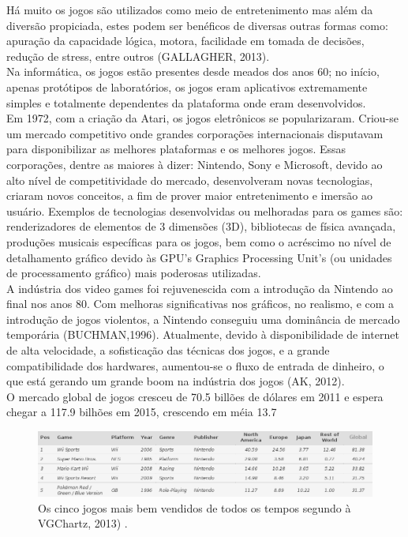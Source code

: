 \documentclass{article}
\begin{document}
Há muito os jogos são utilizados como meio de entretenimento mas além da diversão propiciada, estes podem ser benéficos de diversas outras formas como: apuração da capacidade lógica, motora, facilidade em tomada de decisões, redução de stress, entre outros (GALLAGHER, 2013).
\\
	Na informática, os jogos estão presentes desde meados dos anos 60; no início, apenas protótipos de laboratórios, os jogos eram aplicativos extremamente simples e totalmente dependentes da plataforma onde eram desenvolvidos.
\\
	Em 1972, com a criação da Atari, os jogos eletrônicos se popularizaram. Criou-se um mercado competitivo onde grandes corporações internacionais disputavam para disponibilizar as melhores plataformas e os melhores jogos.  Essas corporações, dentre as maiores à dizer: Nintendo, Sony e Microsoft, devido ao alto nível de competitividade do mercado, desenvolveram novas tecnologias, criaram novos conceitos, a fim de prover maior entretenimento e imersão ao usuário. Exemplos de tecnologias desenvolvidas ou melhoradas para os games são: renderizadores de elementos de 3 dimensões (3D), bibliotecas de física avançada, produções musicais específicas para os jogos, bem como o acréscimo no nível de detalhamento gráfico devido às GPU's Graphics Processing Unit's (ou unidades de processamento gráfico) mais poderosas utilizadas.
\\
	A indústria dos video games foi rejuvenescida com a introdução da Nintendo ao final nos anos 80. Com melhoras significativas  nos gráficos, no realismo, e com a introdução de jogos violentos, a Nintendo conseguiu uma dominância de mercado temporária (BUCHMAN,1996).
	Atualmente, devido à disponibilidade de internet de alta velocidade, a sofisticação das técnicas dos jogos, e a grande compatibilidade dos hardwares, aumentou-se o fluxo de entrada de dinheiro, o que está gerando um grande boom na indústria dos jogos (AK, 2012).
\\
	O mercado global de jogos cresceu de 70.5 billões de dólares em 2011 e espera chegar a 117.9 bilhões em 2015, crescendo em méia 13.7%


\begin{figure}[!htbp]
    \begin{center}
        \includegraphics[width=\textwidth]{asset/img/bestSelledGames.jpg}
               \caption{Os cinco jogos mais bem vendidos de todos os tempos segundo à VGChartz, 2013) . \label{fig:Jogos mais bem vendidos}}
    \end{center}
\end{figure}
\end{document}
